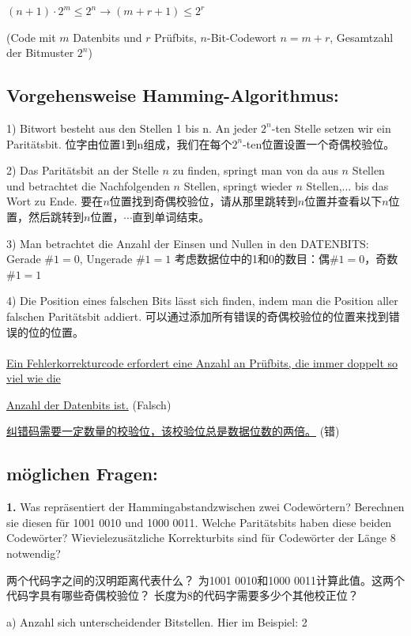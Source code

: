 \documentclass[fleqn]{article}
\begin{document}
$(n+1)\cdot 2^m \leq 2^n \rightarrow (m+r+1)\leq 2^r$

\noindent(Code mit $m$ Datenbits und $r$ Prüfbits, $n$-Bit-Codewort $n=m+r$, Gesamtzahl der Bitmuster $2^n$)

\subsection{Vorgehensweise Hamming-Algorithmus:}

1) Bitwort besteht aus den Stellen 1 bis n. An jeder $2^n$-ten Stelle setzen wir ein Paritätsbit.
位字由位置1到n组成，我们在每个$ 2 ^ n $-ten位置设置一个奇偶校验位。

2) Das Paritätsbit an der Stelle $n$ zu finden, springt man von da aus $n$ Stellen und betrachtet die Nachfolgenden $n$ Stellen, springt wieder $n$ Stellen,$\dots$ bis das Wort zu Ende.
要在$ n $位置找到奇偶校验位，请从那里跳转到$ n $位置并查看以下$ n $位置，然后跳转到$ n $位置，$ \cdots$直到单词结束。

3) Man betrachtet die Anzahl der Einsen und Nullen in den DATENBITS: Gerade $\#1 = 0$, Ungerade $\#1 = 1$
考虑数据位中的1和0的数目：偶$ \#1 = 0 $，奇数$ \#1 = 1 $

4) Die Position eines falschen Bits lässt sich finden, indem man die Position aller falschen Paritätsbit addiert.
可以通过添加所有错误的奇偶校验位的位置来找到错误的位的位置。
\\
\\
\underline{Ein Fehlerkorrekturcode erfordert eine Anzahl an Prüfbits, die immer doppelt so viel wie die}

\underline{Anzahl der Datenbits ist.} (Falsch)

\underline{纠错码需要一定数量的校验位，该校验位总是数据位数的两倍。} (错)

\subsection{möglichen Fragen:}

\textbf{1.} Was repräsentiert der Hammingabstandzwischen zwei Codewörtern? Berechnen sie diesen für 1001 0010 und 1000 0011. Welche Paritätsbits haben diese beiden Codewörter? Wievielezusätzliche Korrekturbits sind für Codewörter der Länge 8 notwendig?

两个代码字之间的汉明距离代表什么？ 为1001 0010和1000 0011计算此值。这两个代码字具有哪些奇偶校验位？ 长度为8的代码字需要多少个其他校正位？

a) Anzahl sich unterscheidender Bitstellen. Hier im Beispiel: 2
\end{document}

